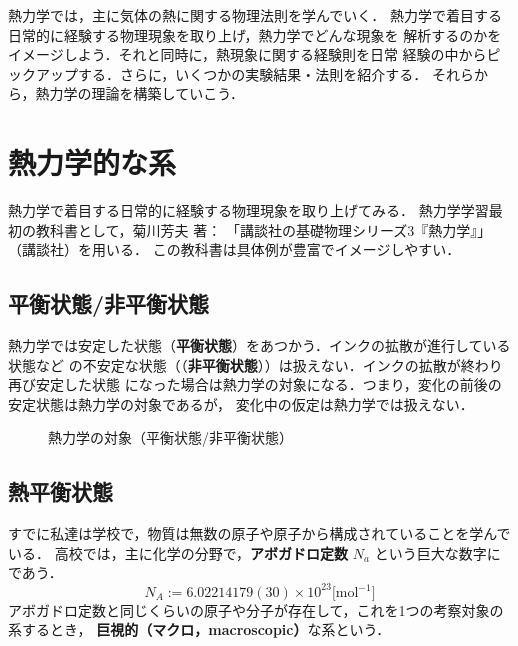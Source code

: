 \begin{mycomment}
    熱力学では，主に気体の熱に関する物理法則を学んでいく．
    熱力学で着目する日常的に経験する物理現象を取り上げ，熱力学でどんな現象を
    解析するのかをイメージしよう．それと同時に，熱現象に関する経験則を日常
    経験の中からピックアップする．さらに，いくつかの実験結果・法則を紹介する．
    それらから，熱力学の理論を構築していこう．
\end{mycomment}

\section{熱力学的な系}
    \begin{mycomment}
        熱力学で着目する日常的に経験する物理現象を取り上げてみる．
        熱力学学習最初の教科書として，菊川芳夫 著：
        「講談社の基礎物理シリーズ3『熱力学』」（講談社）を用いる．
        この教科書は具体例が豊富でイメージしやすい．
    \end{mycomment}

    \subsection{平衡状態/非平衡状態}
    熱力学では安定した状態（\textbf{平衡状態}）をあつかう．インクの拡散が進行している状態など
    の不安定な状態（（\textbf{非平衡状態}））は扱えない．インクの拡散が終わり再び安定した状態
    になった場合は熱力学の対象になる．つまり，変化の前後の安定状態は熱力学の対象であるが，
    変化中の仮定は熱力学では扱えない．
    \begin{figure}[hbt]
        \begin{center}
            \caption{熱力学の対象（平衡状態/非平衡状態）}
            \label{fig:heikou_hiheikou}
        \end{center}
    \end{figure}

    \subsection{熱平衡状態}
        すでに私達は学校で，物質は無数の原子や原子から構成されていることを学んでいる．
        高校では，主に化学の分野で，\textbf{アボガドロ定数} ${N}_{a}$ という巨大な数字に
        であう．
        \begin{equation}
            {N}_{A} := 6.02214179(30) \times {10}^{23} \mbox{[mol${}^{-1}$]}
        \end{equation}
        アボガドロ定数と同じくらいの原子や分子が存在して，これを1つの考察対象の系するとき，
        \textbf{巨視的（マクロ，macroscopic）}な系という．

